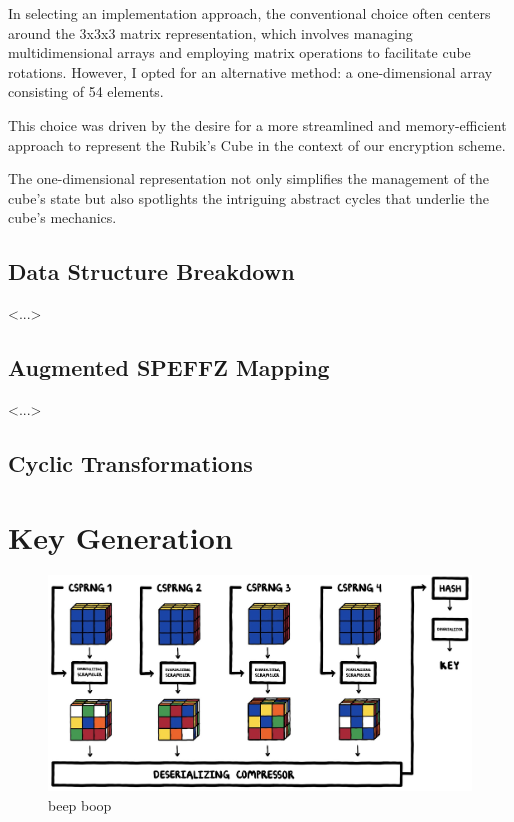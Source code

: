 \documentclass[12pt]{article}
\begin{document}
In selecting an implementation approach, the conventional choice often centers around the 3x3x3 matrix representation, which involves managing multidimensional arrays and employing matrix operations to facilitate cube rotations. However, I opted for an alternative method: a one-dimensional array consisting of 54 elements. 

This choice was driven by the desire for a more streamlined and memory-efficient approach to represent the Rubik's Cube in the context of our encryption scheme.

The one-dimensional representation not only simplifies the management of the cube's state but also spotlights the intriguing abstract cycles that underlie the cube's mechanics.  
\subsection{Data Structure Breakdown}
<...>

\subsection{Augmented SPEFFZ Mapping}
<...>

\subsection{Cyclic Transformations}

\section{Key Generation}

\begin{figure}[H]
    \centering
    \includegraphics[width=\textwidth]{key_gen/keygen.jpg}
    \caption{beep boop}
\end{figure}
\end{document}
